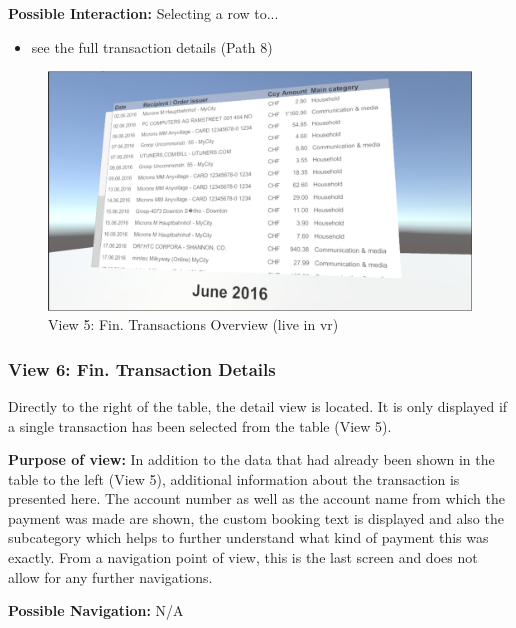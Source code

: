 \textbf{Possible Interaction:} Selecting a row to...
\begin{itemize}[noitemsep,nolistsep]
	\item see the full transaction details (Path 8)
\end{itemize}

\begin{figure}[h]
	\begin{center}
		\includegraphics[width=12cm]{03_Figures/08_Development/View5_FinTransactionsOverview.png}
		\caption{View 5: Fin. Transactions Overview (live in \gls{vr})}
		\label{fig:unityview5}
	\end{center}
\end{figure}


\subsubsection{View 6: Fin. Transaction Details}

Directly to the right of the table, the detail view is located. It is only displayed if a single transaction has been selected from the table (View 5).

\textbf{Purpose of view:} In addition to the data that had already been shown in the table to the left (View 5), additional information about the transaction is presented here. The account number as well as the account name from which the payment was made are shown, the custom booking text is displayed and also the subcategory which helps to further understand what kind of payment this was exactly. From a navigation point of view, this is the last screen and does not allow for any further navigations.

\textbf{Possible Navigation:} N/A

